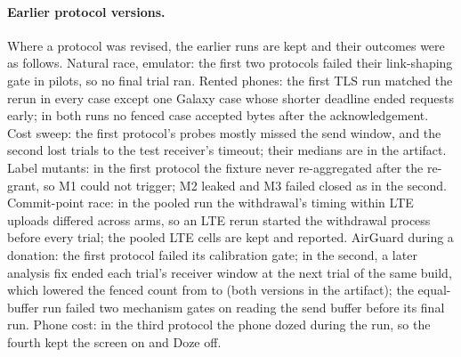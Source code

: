 \paragraph{Earlier protocol versions.} Where a protocol was revised, the earlier runs are kept and their outcomes were as
follows. Natural race, emulator: the first two protocols failed their link-shaping gate in pilots, so no final trial ran.
Rented phones: the first TLS run matched the rerun in every case except one Galaxy case whose shorter deadline ended
requests early; in both runs no fenced case accepted bytes after the acknowledgement. Cost sweep: the first protocol's
probes mostly missed the send window, and the second lost trials to the test receiver's timeout; their medians are in the
artifact. Label mutants: in the first protocol the fixture never re-aggregated after the re-grant, so M1 could not
trigger; M2 leaked and M3 failed closed as in the second. Commit-point race: in the pooled run the withdrawal's timing
within LTE uploads differed across arms, so an LTE rerun started the withdrawal process before every trial; the pooled
LTE cells are kept and reported. AirGuard during a donation: the first protocol failed its calibration gate; in the
second, a later analysis fix ended each trial's receiver window at the next trial of the same build, which lowered the
fenced count from \gaFenceRxFirst{} to \gaFenceRx{} (both versions in the artifact); the equal-buffer run failed two mechanism gates on
reading the send buffer before its final run. Phone cost: in the third protocol the phone dozed during the run, so the
fourth kept the screen on and Doze off.
